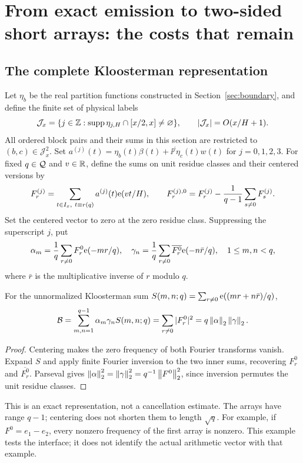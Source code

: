 \section{From exact emission to two-sided short arrays: the costs that remain}\label{sec:emitter}
\subsection{The complete Kloosterman representation}
Let $\eta_b$ be the real partition functions constructed in Section~\ref{sec:boundary}, and define the finite set of physical labels
\[
\mathcal J_x=\{j\in\mathbb Z:\operatorname{supp}\eta_{j,H}\cap[x/2,x]\ne\varnothing\},
\qquad |\mathcal J_x|=O(x/H+1).
\]
All ordered block pairs and their sums in this section are restricted to $(b,c)\in\mathcal J_x^2$. Set
$a^{(j)}(t)=\eta_b(t)\beta(t)+\ii^j\eta_c(t)w(t)$ for $j=0,1,2,3$.
For fixed $q\in\mathcal Q$ and $v\in\mathbb R$, define the sums on unit residue classes and their centered versions by
\[
F_r^{(j)}=\sum_{t\in I_x,\ t\equiv r(q)}a^{(j)}(t)\mathrm e(vt/H),\qquad
F_r^{(j),0}=F_r^{(j)}-\frac1{q-1}\sum_{s\ne0}F_s^{(j)}.
\]
Set the centered vector to zero at the zero residue class. Suppressing the superscript $j$, put
\[
\alpha_m=\frac1q\sum_{r\ne0}F_r^0\mathrm e(-mr/q),\quad
\gamma_n=\frac1q\sum_{r\ne0}\overline{F_r^0}\mathrm e(-n\bar r/q),\quad 1\le m,n<q,
\]
where $\bar r$ is the multiplicative inverse of $r$ modulo $q$.
\begin{proposition}\label{prop:emitter}
For the unnormalized Kloosterman sum $S(m,n;q)=\sum_{r\ne0}\mathrm e((mr+n\bar r)/q)$,
\[
\mathcal B=\sum_{m,n=1}^{q-1}\alpha_m\gamma_nS(m,n;q)
=\sum_{r\ne0}|F_r^0|^2
=q\left\|\alpha\right\|_2\left\|\gamma\right\|_2.
\]
\end{proposition}
\begin{proof}
Centering makes the zero frequency of both Fourier transforms vanish. Expand $S$ and apply finite Fourier inversion to the two inner sums, recovering $F_r^0$ and $\overline{F_r^0}$. Parseval gives
$\left\|\alpha\right\|_2^2=\left\|\gamma\right\|_2^2=q^{-1}\left\|F^0\right\|_2^2$, since inversion permutes the unit residue classes.
\end{proof}
This is an exact representation, not a cancellation estimate. The arrays have range $q-1$; centering does not shorten them to length $\sqrt q$. For example, if $F^0=e_1-e_2$, every nonzero frequency of the first array is nonzero. This example tests the interface; it does not identify the actual arithmetic vector with that example.

